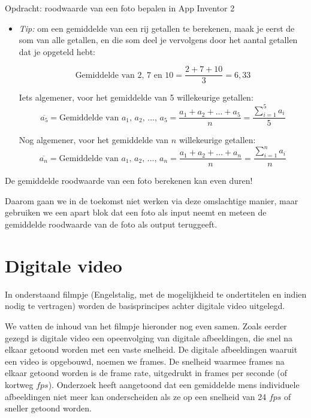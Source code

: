 \begin{opdracht}{Opdracht: roodwaarde van een foto bepalen in App Inventor 2}
\begin{enumerate}
\begin{itemize}
		\item \emph{Tip:} om een gemiddelde van een rij getallen te berekenen, maak je eerst de som van alle getallen, en die som deel je vervolgens door het aantal getallen dat je opgeteld hebt:
		
		\begin{equation*}
		\text{Gemiddelde van 2, 7 en 10} = \frac{2+7+10}{3} = 6,33
		\end{equation*}
		
		Iets algemener, voor het gemiddelde van 5 willekeurige getallen:
		\begin{equation*}
		\overline{a_5} = \text{Gemiddelde van $a_1$, $a_2$, ..., $a_5$} = \frac{a_1+a_2+\ldots+a_5}{n} = \frac{\sum_{i=1}^{5} a_i}{5}
		\end{equation*}
		
		Nog algemener, voor het gemiddelde van $n$ willekeurige getallen:
		\begin{equation*}
		\overline{a_n} = \text{Gemiddelde van $a_1$, $a_2$, ..., $a_n$} = \frac{a_1+a_2+\ldots+a_n}{n} = \frac{\sum_{i=1}^{n} a_i}{n}
		\end{equation*}
		
	\end{itemize}

	\begin{opmerking}
		De gemiddelde roodwaarde van een foto berekenen kan even duren!
		
		Daarom gaan we in de toekomst niet werken via deze omslachtige manier, maar gebruiken we een apart blok dat een foto als input neemt en meteen de gemiddelde roodwaarde van de foto als output teruggeeft.
	\end{opmerking}
\end{enumerate}
\end{opdracht}

\section{Digitale video}
\label{sec:Mod3_Sec2}
%

In onderstaand filmpje (Engelstalig, met de mogelijkheid te ondertitelen en indien nodig te vertragen) worden de basisprincipes achter digitale video uitgelegd. 


We vatten de inhoud van het filmpje hieronder nog even samen. Zoals eerder gezegd is digitale video een opeenvolging van digitale afbeeldingen, die snel na elkaar getoond worden met een vaste snelheid.
De digitale afbeeldingen waaruit een video is opgebouwd, noemen we frames.
De snelheid waarmee frames na elkaar getoond worden is de frame rate, uitgedrukt in frames per seconde (of kortweg $fps$).
Onderzoek heeft aangetoond dat een gemiddelde mens individuele afbeeldingen niet meer kan onderscheiden als ze op een snelheid van 24 $fps$ of sneller getoond worden.

